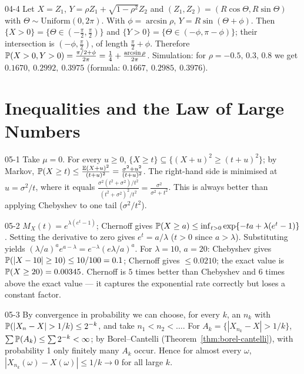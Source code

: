 \begin{solution}{04-4}
Let $X=Z_1$, $Y=\rho Z_1+\sqrt{1-\rho^2}Z_2$ and $(Z_1,Z_2)=(R\cos\Theta,R\sin\Theta)$ with $\Theta\sim\text{Uniform}(0,2\pi)$. With $\phi=\arcsin\rho$, $Y=R\sin(\Theta+\phi)$. Then $\{X>0\}=\{\Theta\in(-\frac\pi2,\frac\pi2)\}$ and $\{Y>0\}=\{\Theta\in(-\phi,\pi-\phi)\}$; their intersection is $(-\phi,\frac\pi2)$, of length $\frac\pi2+\phi$. Therefore $\P(X>0,Y>0)=\frac{\pi/2+\phi}{2\pi}=\frac14+\frac{\arcsin\rho}{2\pi}$. Simulation: for $\rho=-0.5,\,0.3,\,0.8$ we get $0.1670,\ 0.2992,\ 0.3975$ (formula: $0.1667,\ 0.2985,\ 0.3976$).
\end{solution}

\section{Inequalities and the Law of Large Numbers}

\begin{solution}{05-1}
Take $\mu=0$. For every $u\ge0$, $\{X\ge t\}\subseteq\{(X+u)^2\ge(t+u)^2\}$; by Markov,
$\P(X\ge t)\le\frac{\E(X+u)^2}{(t+u)^2}=\frac{\sigma^2+u^2}{(t+u)^2}$. The right-hand side is minimised at $u=\sigma^2/t$, where it equals $\frac{\sigma^2(t^2+\sigma^2)/t^2}{(t^2+\sigma^2)^2/t^2}=\frac{\sigma^2}{\sigma^2+t^2}$. This is always better than applying Chebyshev to one tail ($\sigma^2/t^2$).
\end{solution}

\begin{solution}{05-2}
$M_X(t)=e^{\lambda(e^t-1)}$; Chernoff gives $\P(X\ge a)\le\inf_{t>0}\exp\{-ta+\lambda(e^t-1)\}$. Setting the derivative to zero gives $e^t=a/\lambda$ ($t>0$ since $a>\lambda$). Substituting yields $(\lambda/a)^ae^{a-\lambda}=e^{-\lambda}(e\lambda/a)^a$.
For $\lambda=10$, $a=20$: Chebyshev gives $\P(|X-10|\ge10)\le10/100=0.1$; Chernoff gives $\le0.0210$; the exact value is $\P(X\ge20)=0.00345$. Chernoff is $5$ times better than Chebyshev and $6$ times above the exact value --- it captures the exponential rate correctly but loses a constant factor.
\end{solution}

\begin{solution}{05-3}
By convergence in probability we can choose, for every $k$, an $n_k$ with $\P(|X_n-X|>1/k)\le2^{-k}$, and take $n_1<n_2<\dots$. For $A_k=\{|X_{n_k}-X|>1/k\}$, $\sum\P(A_k)\le\sum2^{-k}<\infty$; by Borel--Cantelli (Theorem~\ref{thm:borel-cantelli}), with probability 1 only finitely many $A_k$ occur. Hence for almost every $\omega$, $|X_{n_k}(\omega)-X(\omega)|\le1/k\to0$ for all large $k$.
\end{solution}

